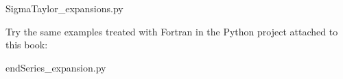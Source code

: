  {Sigma}{Taylor_expansions.py}
  
 
    
   
   \newpage 
   Try the same examples treated with Fortran in the Python project attached to this book:
      
   \vspace{0.5cm}
   {end}{Series_expansion.py}
   \lstfor
   
   
   
   
  
  
  
  
  
   
%
%
%
%
%
